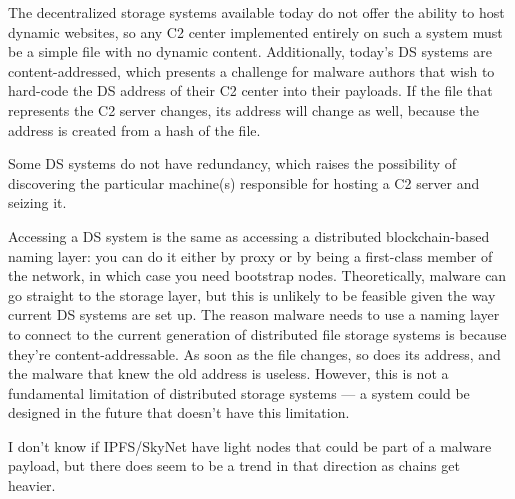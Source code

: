 The decentralized storage systems available today do not offer the ability to 
host dynamic 
websites, so any C2 center implemented entirely on such a system must be a 
simple file with no 
dynamic content. Additionally, today's DS systems are 
content-addressed, which presents a challenge 
for malware authors that wish to hard-code the DS address of their C2 center 
into their payloads. 
If the file that represents the C2 server changes, its address will change as 
well, because the 
address is created from a hash of the file.

Some DS systems do not have redundancy, which raises the possibility of 
discovering the particular 
machine(s) responsible for hosting a C2 server and seizing it. 



Accessing a DS system is the same as accessing a distributed 
blockchain-based naming layer: you can do it either by proxy 
or by being a first-class member of the network, in which 
case you need bootstrap nodes. Theoretically, malware can go 
straight to the storage layer, but this is unlikely to be 
feasible given the way current DS systems are set up. The 
reason malware needs 
to use a naming layer to connect to the current generation of 
distributed file storage systems is because they're 
content-addressable. As soon as the file changes, so 
does its address, and the malware that knew the old address 
is useless. 
However, this is not a fundamental limitation of distributed 
storage systems --- a system could be designed in the future 
that doesn't have this limitation.

I don't know if IPFS/SkyNet have light nodes that could be 
part of a malware payload, but there does seem to be a trend 
in that direction as chains get heavier.